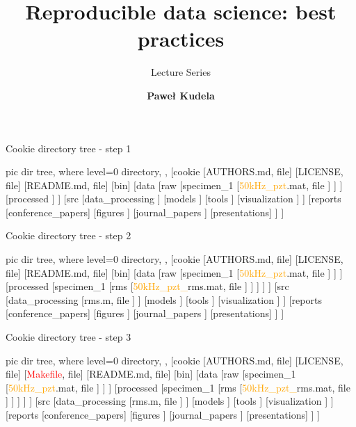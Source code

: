 \documentclass[10pt,aspectratio=169]{beamer} %
\date{}
\title{Reproducible data science: best practices}
\subtitle{Lecture Series}
\author{\textbf{Paweł Kudela} }
\institute{Institute of Fluid Flow Machinery\\Polish Academy of Sciences \\ \vspace{-1.5cm}\flushright %
\texttt{[image: /pkudela\_odroid\_sensors/MISD\_shared/logo/logo\_eng\_40mm.eps]}}
\begin{document}
\begin{frame}[t]{Cookie directory tree - step 1}
\centering
	\begin{forest}
		pic dir tree,
		where level=0{}{%
			directory,
		},
		[cookie
		[AUTHORS.md, file]
		[LICENSE, file]
		[README.md, file]
		[bin]
		[data
		[raw
			[specimen\_1
				[\textcolor{orange}{50kHz\_pzt}.mat, file
				]
			]
		]
		[processed
		]
		]
		[src
			[data\_processing
			]
			[models
			]
			[tools
			]
			[visualization
			]
		]
		[reports
			[conference\_papers]	
			[figures
			]
			[journal\_papers
			]
			[presentations]
		]
		]
	\end{forest}
\end{frame}
\begin{frame}[t]{Cookie directory tree - step 2}
\centering
	\begin{forest}
		pic dir tree,
		where level=0{}{%
			directory,
		},
		[cookie
		[AUTHORS.md, file]
		[LICENSE, file]
		[README.md, file]
		[bin]
		[data
		[raw
			[specimen\_1
				[\textcolor{orange}{50kHz\_pzt}.mat, file
				]
			]
		]
		[processed
			[specimen\_1
				[\alert{rms}
					[\textcolor{orange}{50kHz\_pzt\_}\alert{rms}.mat, file
					]
				]
			]
		]
		]
		[src
			[data\_processing
				[\alert{rms}.m, file
				]
			]
			[models
			]
			[tools
			]
			[visualization
			]
		]
		[reports
			[conference\_papers]	
			[figures
			]
			[journal\_papers
			]
			[presentations]
		]
		]
	\end{forest}
\end{frame}
\begin{frame}[t]{Cookie directory tree - step 3}
\centering
	\begin{forest}
		pic dir tree,
		where level=0{}{%
			directory,
		},
		[cookie
		[AUTHORS.md, file]
		[LICENSE, file]
		[\textcolor{red}{Makefile}, file]
		[README.md, file]
		[bin]
		[data
		[raw
			[specimen\_1
				[\textcolor{orange}{50kHz\_pzt}.mat, file
				]
			]
		]
		[processed
			[specimen\_1
				[\alert{rms}
					[\textcolor{orange}{50kHz\_pzt\_}\alert{rms}.mat, file
					]
				]
			]
		]
		]
		[src
			[data\_processing
				[\alert{rms}.m, file
				]
			]
			[models
			]
			[tools
			]
			[visualization
			]
		]
		[reports
			[conference\_papers]	
			[figures
			]
			[journal\_papers
			]
			[presentations]
		]
		]
	\end{forest}
\end{frame}
\end{document}
